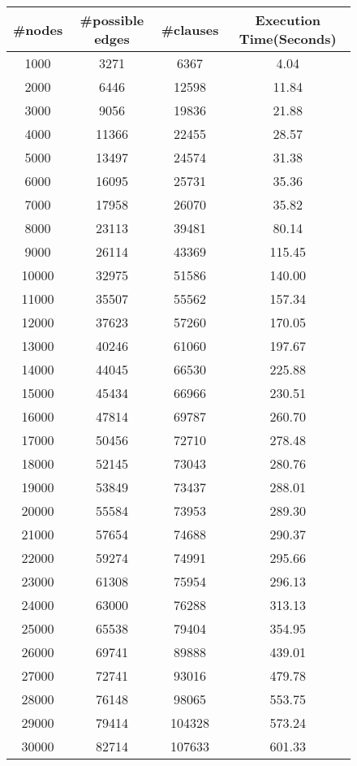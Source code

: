 \begin{figure}[htp]

\begin{center}
  \begin{tabular}{ | c | c | c | c | }
    \hline
    \#nodes & \#possible edges & \#clauses & Execution Time(Seconds) \\ \hline
	  	1000 & 3271 & 6367 &  4.04   \\ \hline
	  	2000 & 6446 & 12598 & 11.84    \\ \hline
	  	3000 & 9056 & 19836 &  21.88   \\ \hline
	  	4000 & 11366 & 22455 &  28.57   \\ \hline
	  	5000 & 13497 & 24574 &  31.38   \\ \hline
	  	6000 & 16095 & 25731 &  35.36   \\ \hline
	  	7000 & 17958 & 26070 &  35.82   \\ \hline
	  	8000 & 23113 & 39481 &  80.14   \\ \hline
	  	9000 & 26114 & 43369 &  115.45   \\ \hline
	  	10000 & 32975 & 51586 &  140.00   \\ \hline
	  	11000 & 35507 & 55562 &  157.34   \\ \hline
	  	12000 & 37623 & 57260 &  170.05   \\ \hline
	  	13000 & 40246 & 61060 &  197.67   \\ \hline	  	
	  	14000 & 44045 & 66530 &  225.88   \\ \hline
	  	15000 & 45434 & 66966 &  230.51   \\ \hline
	  	16000 & 47814 & 69787 &  260.70   \\ \hline
	  	17000 & 50456 & 72710 &  278.48  \\ \hline
	  	18000 & 52145 & 73043 &  280.76  \\ \hline
	  	19000 & 53849 & 73437 &  288.01  \\ \hline
	  	20000 & 55584 & 73953 &  289.30  \\ \hline	  	
	  	21000 & 57654 & 74688 &  290.37  \\ \hline
		22000 & 59274 & 74991 &  295.66   \\ \hline
		23000 & 61308 & 75954 &  296.13   \\ \hline
		24000 & 63000 & 76288 &  313.13  \\ \hline
		25000 & 65538 & 79404 &  354.95   \\ \hline
		26000 & 69741 & 89888 &  439.01   \\ \hline
		27000 & 72741 & 93016 &  479.78  \\ \hline
		28000 & 76148 & 98065 &  553.75   \\ \hline
		29000 & 79414 & 104328 &  573.24   \\ \hline
		30000 & 82714 & 107633 &  601.33   \\ \hline


\end{tabular}
\end{center}
\end{figure}
